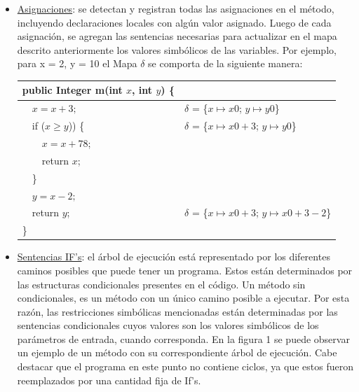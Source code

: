 \documentclass{llncs}
\begin{document}
\begin{itemize}
  \item \underline{Asignaciones}: se detectan y registran todas las asignaciones en el método, incluyendo declaraciones locales con algún valor asignado. Luego de cada asignación, se agregan las sentencias necesarias para actualizar en el mapa descrito anteriormente los valores simbólicos de las variables. Por ejemplo, para x = 2, y = 10 el Mapa $\delta$ se comporta de la siguiente manera:
      \begin{table}
	\centering
	\begin{tabular}{|m{5cm} | m{5cm}|}
	  \hline
	  public Integer m(int $x$, int $y$) \{  & \\
	  \hline
	  \ \ $x = x +3;$ & $\delta$ = \{$x \mapsto x0$; $y \mapsto y0$\} \\
	  \hline
	  \ \ if ($x \geq y $)) \{ & $\delta$ = \{$x \mapsto x0 + 3$; $y \mapsto y0$\} \\
	  \hline
	  \ \ \ \ $x = x +78$; & \\
	  \hline
	  \ \ \ \ return $x$; & \\
	  \hline
	  \ \ \} & \\
	  \hline
	  \ \ $y = x - 2;$ & \\
	  \hline
	  \ \ return $y$; & $\delta$ = \{$x \mapsto x0 + 3$; $y \mapsto x0 +3 - 2$\} \\
	  \hline
	  \} & \\
	  \hline
	\end{tabular}
      \end{table}
      
  \item \underline{Sentencias IF’s}: el árbol de ejecución está representado por los diferentes caminos posibles que puede tener un programa. Estos están determinados por las estructuras condicionales presentes en el código. Un método sin condicionales, es un método con un único camino posible a ejecutar. Por esta razón, las restricciones simbólicas mencionadas están determinadas por las sentencias condicionales cuyos valores son los valores simbólicos de los parámetros de entrada, cuando corresponda. En la figura 1 se puede observar un ejemplo de un método con su correspondiente árbol de ejecución. Cabe destacar que el programa en este punto no contiene ciclos, ya que estos fueron reemplazados por una cantidad fija de If’s.
\end{itemize}


\end{document}
